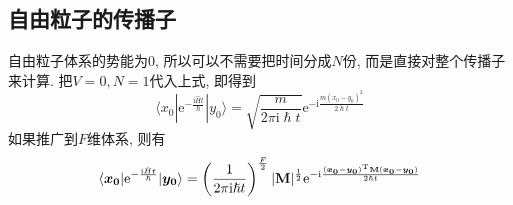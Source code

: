         \subsection{自由粒子的传播子}

        自由粒子体系的势能为0, 所以可以不需要把时间分成$N$份, 而是直接对整个传播子来计算. 把$V=0,N=1$代入上式, 即得到
        \begin{equation}\label{eq:8-2-2}
            \langle x_0 | \mathrm{e}^{-\frac {\mathrm{i}\hat{H}t}{\hslash}} | y_0 \rangle = \sqrt{\frac {m}{2\pi\mathrm{i} \hslash t}} \mathrm{e}^{-\mathrm{i}\frac {m(x_0 - y_0)^2}{2\hslash t}}
        \end{equation}
        如果推广到$F$维体系, 则有
        \begin{equation}
            \langle \bm{x_0} | \mathrm{e}^{-\frac {\mathrm{i}\hat{H}t}{\hslash}} |\bm{y_0} \rangle = \left(\frac {1}{2\pi\mathrm{i} \hslash t} \right)^{\frac F2} |\mathbf{M}|^{\frac 12} \mathrm{e}^{-\mathrm{i}\frac {(\bm{x_0}-\bm{y_0})^{\mathrm{T}} \mathbf{M} (\bm{x_0}-\bm{y_0})}{2\hslash t}}
        \end{equation}

        \splitline

